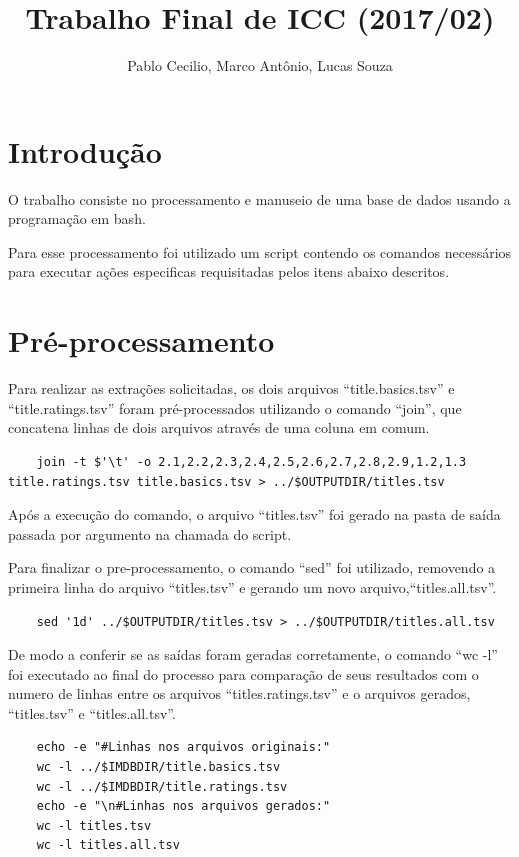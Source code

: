 \documentclass[12pt]{article}
\title{Trabalho Final de ICC (2017/02)}
\author{Pablo Cecilio, Marco Antônio, Lucas Souza}
\date{}
\begin{document}
	\maketitle
	
	\section{Introdução}
	
	O trabalho consiste no processamento e manuseio de uma base de dados usando a programação em bash.
	
	Para esse processamento foi utilizado um script contendo os comandos necessários para executar ações especificas requisitadas pelos itens abaixo descritos.
	
	\section{Pré-processamento}
	
	Para realizar as extrações solicitadas, os dois arquivos ``title.basics.tsv'' e ``title.ratings.tsv'' foram pré-processados utilizando o comando ``join'',  que concatena linhas de dois arquivos através de uma coluna em comum.
	
	\begin{verbatim}
	join -t $'\t' -o 2.1,2.2,2.3,2.4,2.5,2.6,2.7,2.8,2.9,1.2,1.3 title.ratings.tsv title.basics.tsv > ../$OUTPUTDIR/titles.tsv
	\end{verbatim}
	
	Após a execução do comando, o arquivo ``titles.tsv'' foi gerado na pasta de saída passada por argumento na chamada do script.
	
	\pagebreak
	
	Para finalizar o pre-processamento, o comando ``sed'' foi utilizado, removendo a primeira linha do arquivo ``titles.tsv'' e gerando um novo arquivo,``titles.all.tsv''. 
	
	\begin{verbatim}
	sed '1d' ../$OUTPUTDIR/titles.tsv > ../$OUTPUTDIR/titles.all.tsv
	\end{verbatim}
	
	De modo a conferir se as saídas foram geradas corretamente, o comando ``wc -l'' foi executado ao final do processo para comparação de seus resultados com o numero de linhas entre os arquivos ``titles.ratings.tsv'' e o arquivos gerados, ``titles.tsv'' e ``titles.all.tsv''.
	
	\begin{verbatim}
	echo -e "#Linhas nos arquivos originais:"
	wc -l ../$IMDBDIR/title.basics.tsv
	wc -l ../$IMDBDIR/title.ratings.tsv
	echo -e "\n#Linhas nos arquivos gerados:"
	wc -l titles.tsv
	wc -l titles.all.tsv
	\end{verbatim}
	
\end{document}
